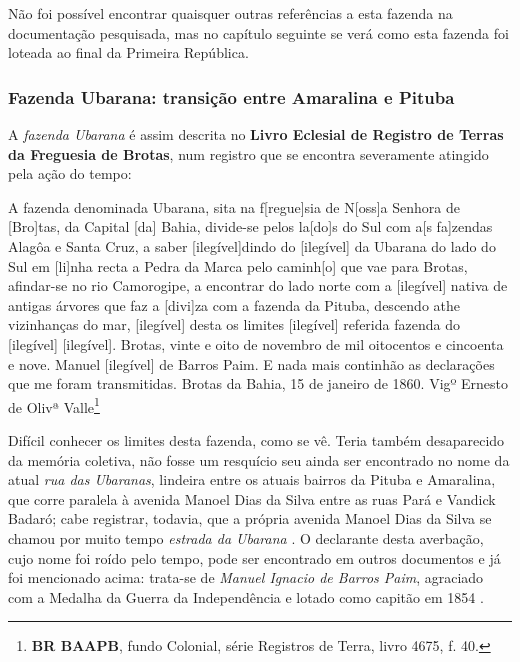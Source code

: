 Não foi possível encontrar quaisquer outras referências a esta fazenda na documentação pesquisada, mas no capítulo seguinte se verá como esta fazenda foi loteada ao final da Primeira República.

\subsubsection{Fazenda Ubarana: transição entre Amaralina e Pituba}

A \textit{fazenda Ubarana} é assim descrita no \textbf{Livro Eclesial de Registro de Terras da Freguesia de Brotas}, num registro que se encontra severamente atingido pela ação do tempo:

\begin{citacao}
A fazenda denominada Ubarana, sita na f[regue]sia de N[oss]a Senhora de [Bro]tas, da Capital [da] Bahia, divide-se pelos la[do]s do Sul com a[s fa]zendas Alagôa e Santa Cruz, a saber [ilegível]dindo do [ilegível] da Ubarana do lado do Sul em [li]nha recta a Pedra da Marca pelo caminh[o] que vae para Brotas, afindar-se no rio Camorogipe, a encontrar do lado norte com a [ilegível] nativa de antigas árvores que faz a [divi]za com a fazenda da Pituba, descendo athe vizinhanças do mar, [ilegível] desta os limites [ilegível] referida fazenda do [ilegível] [ilegível]. Brotas, vinte e oito de novembro de mil oitocentos e cincoenta e nove. Manuel [ilegível] de Barros Paim. E nada mais continhão as declarações que me foram transmitidas. Brotas da Bahia, 15 de janeiro de 1860. Vigº Ernesto de Olivª Valle\footnote{\textbf{BR BAAPB}, fundo Colonial, série Registros de Terra, livro 4675, f. 40.}
\end{citacao}

Difícil conhecer os limites desta fazenda, como se vê. Teria também desaparecido da memória coletiva, não fosse um resquício seu ainda ser encontrado no nome da atual \textit{rua das Ubaranas}, lindeira entre os atuais bairros da Pituba e Amaralina, que corre paralela à avenida Manoel Dias da Silva entre as ruas Pará e Vandick Badaró; cabe registrar, todavia, que a própria avenida Manoel Dias da Silva se chamou por muito tempo \textit{estrada da Ubarana} \cite{souza_guia_1935}. O declarante desta averbação, cujo nome foi roído pelo tempo, pode ser encontrado em outros documentos e já foi mencionado acima: trata-se de \textit{Manuel Ignacio de Barros Paim}, agraciado com a Medalha da Guerra da Independência e lotado como capitão em 1854 \cite[p.~172]{masson_almanak_1854}. 

